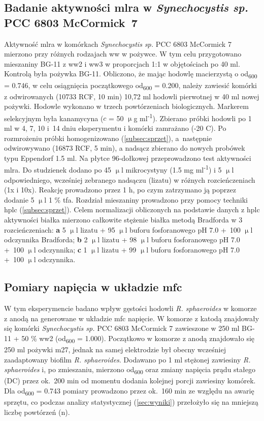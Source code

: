 \subsection{Badanie aktywności \acrshort{mlra} w \textit{Synechocystis sp.} PCC 6803 McCormick~7}\label{subsec:mlra}
Aktywność \acrshort{mlra} w komórkach
\textit{Synechocystis sp.} PCC 6803 McCormick 7 mierzono przy
różnych rodzajach \acrshort{ww} w pożywce.
W tym celu przygotowano mieszaniny BG-11 z \acrshort{ww}2 i \acrshort{ww}3
w proporcjach 1:1 w objętościach po 40 ml.
Kontrolą była pożywka BG-11.
Obliczono, że mając hodowlę macierzystą
o \acrshort{od}\textsubscript{600} = 0.746, w celu osiągnięcia
początkowego \acrshort{od}\textsubscript{600} = 0.200, należy zawiesić
komórki z odwirowanych (10733 RCF, 10 min) 10,72 ml hodowli
pierwotnej w 40 ml nowej pożywki.
Hodowle wykonano w trzech powtórzeniach biologicznych.
Markerem selekcyjnym była kanamycyna ($c$ = 50 $\upmu$g ml\textsuperscript{-1}).
Zbierano próbki hodowli po 1 ml w 4, 7, 10 i~14 dniu eksperymentu
i komórki zamrażano (-20 \degree C).
Po rozmrożeniu próbki homogenizowano (\ref{subsec:sprzet}),
a~następnie odwirowywano (16873 RCF, 5 min), a nadsącz
zbierano do nowych probówek typu Eppendorf 1.5 ml.
Na płytce 96-dołkowej przeprowadzono test aktywności \acrshort{mlra}\@.
Do studzienek dodano po 45 $\upmu$l mikrocystyny (1.5 mg ml\textsuperscript{-1})
i 5 $\upmu$l odpowiedniego, wcześniej zebranego nadsączu (lizatu)
w różnych rozcieńczeniach (1x i 10x).
Reakcję prowadzono przez 1 h, po czym zatrzymano ją
poprzez dodanie 5 $\upmu$l 1 \% \acrshort{tfa}\@.
Rozdział mieszaniny prowadzono przy pomocy techniki \acrshort{hplc} (\ref{subsec:sprzet}).
Celem normalizacji obliczonych na podstawie danych z \acrshort{hplc} aktywności białka
mierzono całkowite stężenie białka metodą Bradforda w 3 rozcieńczeniach:
\textbf{a} 5 $\upmu$l lizatu + 95 $\upmu$l buforu fosforanowego pH 7.0
+~100 $\upmu$l odczynnika Bradforda; \textbf{b} 2 $\upmu$l lizatu
+ 98 $\upmu$l buforu fosforanowego pH 7.0 +~100 $\upmu$l odczynnika;
\textbf{c} 1 $\upmu$l lizatu + 99 $\upmu$l buforu fosforanowego pH 7.0 +~100
$\upmu$l odczynnika.

\subsection{Pomiary napięcia w układzie \acrshort{mfc}}\label{subsec:volt}
W tym eksperymencie badano wpływ gęstości hodowli
\textit{R. sphaeroides} w komorze z anodą na generowane
w układzie \acrshort{mfc} napięcie.
W komorze z katodą znajdowały się komórki
\textit{Synechocystis sp.} PCC 6803 McCormick 7
zawieszone w 250 ml BG-11 + 50 \% \acrshort{ww}2
(\acrshort{od}\textsubscript{600} = 1.000).
Początkowo w komorze z anodą znajdowało się 250 ml
pożywki \acrshort{m27}, jednak na samej elektrodzie był
obecny wcześniej zaadaptowany biofilm \textit{R. sphaeroides}.
Dodawano po 1 ml stężonej zawiesiny \textit{R. sphaeroides}
i, po zmieszaniu, mierzono \acrshort{od}\textsubscript{600} oraz
zmiany napięcia prądu stałego (DC) przez ok.\ 200 min od
momentu dodania kolejnej porcji zawiesiny komórek.
Dla \acrshort{od}\textsubscript{600} = 0.743 pomiary prowadzono
przez ok.\ 160 min ze względu na awarię sprzętu, co podczas
analizy statystycznej (\ref{sec:wyniki}) przełożyło się
na mniejszą liczbę powtórzeń (n).